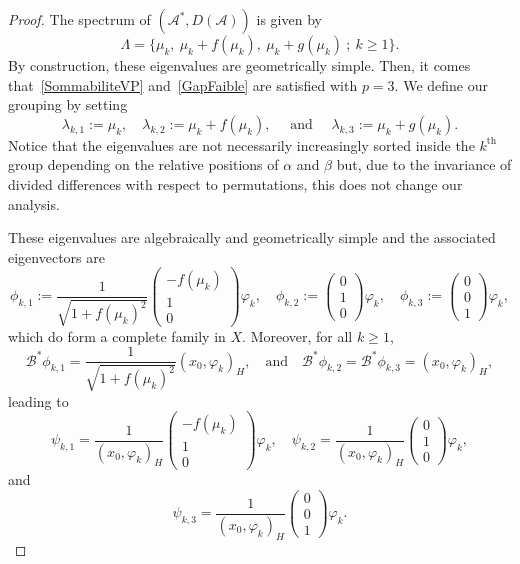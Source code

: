 \documentclass[11pt]{article}
\theoremstyle{definition}
\numberwithin{equation}{section}
\numberwithin{figure}{section}
\numberwithin{table}{section}
\newcommand\A{\mathcal{A}}
\newcommand\As{\mathcal{A}^*}
\newcommand\Bs{\mathcal{B}^*}
\newcommand{\DA}{D(\A)}
\newcommand{\psH}[2]{\left(#1, #2 \right)_H}
\begin{document}
\begin{proof}
The spectrum of $(\As, \DA)$ is given by
\[
\Lambda = \{ \mu_k, \: \mu_k + f(\mu_k), \: \mu_k+g(\mu_k) \: ; \: k \geq 1\}.
\]
By construction, these eigenvalues are geometrically simple. Then, it comes that~\eqref{SommabiliteVP} and~\eqref{GapFaible} are satisfied with $p=3$. We define our grouping by setting
\[
\lambda_{k,1}:=\mu_k, \quad \lambda_{k,2}:=\mu_k+f(\mu_k), \quad \text{ and } \quad \lambda_{k,3} := \mu_k + g(\mu_k).
\]
Notice that the eigenvalues are not necessarily increasingly sorted inside the $k^{\text{th}}$ group depending on the relative positions of $\alpha$ and $\beta$ but, due to the invariance of divided differences with respect to permutations, this does not change our analysis.

These eigenvalues are algebraically and geometrically simple and the associated eigenvectors are
\[
\phi_{k,1} := \frac{1}{\sqrt{1+f(\mu_k)^2}}
\begin{pmatrix} -f(\mu_k) \\1\\0
\end{pmatrix} \varphi_k, \quad
\phi_{k,2} :=
\begin{pmatrix} 0\\1\\0
\end{pmatrix} \varphi_k, \quad
\phi_{k,3} :=
\begin{pmatrix} 0\\0\\1
\end{pmatrix} \varphi_k,
\]
which do form a complete family in $X$. Moreover, for all $k \geq 1$,
\[
\Bs \phi_{k,1}= \frac{1}{\sqrt{1+f(\mu_k)^2}} \psH{x_0}{\varphi_k},
\quad \text{and} \quad
\Bs \phi_{k,2}= \Bs \phi_{k,3} = \psH{x_0}{\varphi_k},
\]
leading to
\[
\psi_{k,1} = \frac{1}{\psH{x_0}{\varphi_k}}
\begin{pmatrix}
-f(\mu_k) \\1\\0
\end{pmatrix} \varphi_k,
\quad
\psi_{k,2} = \frac{1}{\psH{x_0}{\varphi_k}}
\begin{pmatrix}
0\\1\\0
\end{pmatrix} \varphi_k,
\]
and
\[
\psi_{k,3} = \frac{1}{\psH{x_0}{\varphi_k}}
\begin{pmatrix}
0\\0\\1
\end{pmatrix} \varphi_k.
\]
\end{proof}
\end{document}
